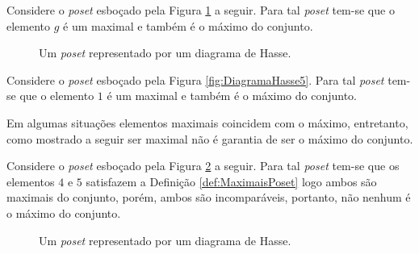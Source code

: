 \begin{example}
	Considere o \textit{poset} esboçado pela Figura \ref{fig:DiagramaHasse7} a seguir. Para tal \textit{poset} tem-se que o elemento $g$ é um maximal e também é o máximo do conjunto.
	
	\begin{figure}[h]
		\centering
		\caption{Um \textit{poset} representado por um diagrama de Hasse.}
		\label{fig:DiagramaHasse7}
	\end{figure}
\end{example}

\begin{example}
	Considere o \textit{poset} esboçado pela Figura \ref{fig:DiagramaHasse5}. Para tal \textit{poset} tem-se que o elemento $1$ é um maximal e também é o máximo do conjunto.
\end{example}

Em algumas situações elementos maximais coincidem com o máximo, entretanto, como mostrado a seguir ser maximal não é garantia de ser o máximo do conjunto.

\begin{example}
	Considere o \textit{poset} esboçado pela Figura \ref{fig:DiagramaHasse8} a seguir. Para tal \textit{poset} tem-se que os elementos $4$ e $5$ satisfazem a Definição \ref{def:MaximaisPoset} logo ambos são maximais do conjunto, porém, ambos são incomparáveis, portanto, não nenhum é o máximo do conjunto.
	
	\begin{figure}[h]
		\centering
		\caption{Um \textit{poset} representado por um diagrama de Hasse.}
		\label{fig:DiagramaHasse8}
	\end{figure}
\end{example} 


